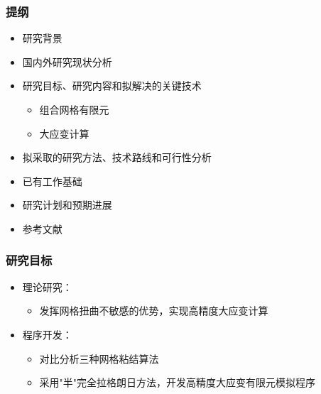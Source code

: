 \documentclass[mathserif]{beamer}
\begin{document}
\begin{CJK}{UTF8}{gkai}
	\begin{frame}
        \frametitle{提纲}
        \begin{itemize}
            \color{gray} 
            \item 研究背景
            \item 国内外研究现状分析
            \item {\color{blue}研究目标、研究内容和拟解决的关键技术 }
		  	\begin{itemize}
		    		\color{gray}
		  		\item 组合网格有限元
				\item 大应变计算
		  	\end{itemize}
            \item 拟采取的研究方法、技术路线和可行性分析
            \item 已有工作基础
	    \item 研究计划和预期进展
            \item 参考文献
        \end{itemize}
	\end{frame}
	
		\begin{frame}
			\frametitle{研究目标}
			\begin{itemize}
				\item 理论研究：
				\begin{itemize}
					\item 发挥网格扭曲不敏感的优势，实现高精度大应变计算
				\end{itemize}
				\item 程序开发：
				\begin{itemize}
					\item 对比分析三种网格粘结算法
					\item 采用"半"完全拉格朗日方法，开发高精度大应变有限元模拟程序
				\end{itemize}
			\end{itemize}
			
		\end{frame}
		

\end{CJK}
\end{document}

